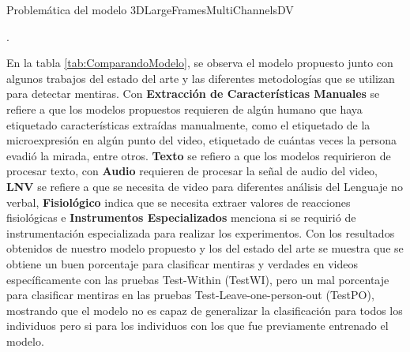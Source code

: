 \begin{onehalfspacing}
\begin{table}[h!]
    \caption{Problemática del modelo 3DLargeFramesMultiChannelsDV}.
    \label{tab:TablaProblematicas3DLargeFramesMultiChannelsDV}
\end{table}


En la tabla \ref{tab:ComparandoModelo}, se observa el modelo propuesto junto con algunos trabajos del estado del arte y las diferentes metodologías que se utilizan para detectar mentiras. Con \textbf{Extracción de Características Manuales} se refiere a que los modelos propuestos requieren de algún humano que haya etiquetado características extraídas manualmente, como el etiquetado de la microexpresión en algún punto del video, etiquetado de cuántas veces la persona evadió la mirada, entre otros. \textbf{Texto} se refiero a que los modelos requirieron de procesar texto, con \textbf{Audio} requieren de procesar la señal de audio del video, \textbf{LNV} se refiere a que se necesita de video para diferentes análisis del Lenguaje no verbal, \textbf{Fisiológico} indica que se necesita extraer valores de reacciones fisiológicas e \textbf{Instrumentos Especializados} menciona si se requirió de instrumentación especializada para realizar los experimentos. Con los resultados obtenidos de nuestro modelo propuesto y los del estado del arte se muestra que se obtiene un buen porcentaje para clasificar mentiras y verdades en videos  específicamente con las pruebas Test-Within (TestWI), pero un mal porcentaje para clasificar mentiras en las pruebas Test-Leave-one-person-out (TestPO), mostrando que el modelo no es capaz de generalizar la clasificación para todos los individuos pero si para los individuos con los que fue previamente entrenado el modelo.


\end{onehalfspacing}

